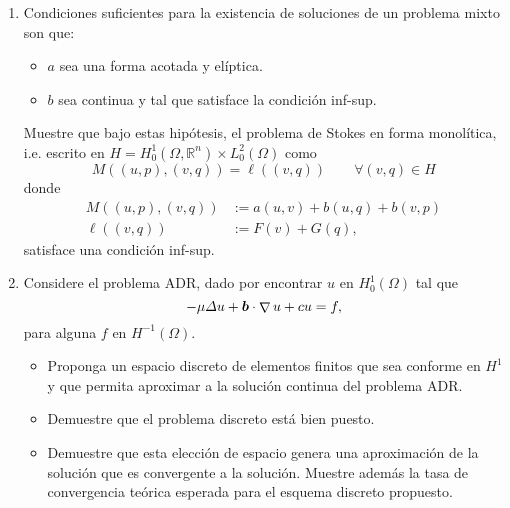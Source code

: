 \documentclass{article}
\renewcommand{\vec}{\vectorsym}
\DeclareMathOperator{\grad}{\nabla}
\newcommand{\R}{\mathbb{R}}
\newcommand{\pts}[1]{[{\bf #1 puntos}] }
\begin{document}
\begin{enumerate}
    \item\pts{2} Condiciones suficientes para la existencia de soluciones de un problema mixto son que:
            \begin{itemize}
                \item $a$ sea una forma acotada y elíptica.
                \item $b$ sea continua y tal que satisface la condición inf-sup.
            \end{itemize}
            Muestre que bajo estas hipótesis, el problema de Stokes en forma monolítica, i.e. escrito en $H = H_0^1(\Omega, \R^n) \times L_0^2(\Omega)$ como
                $$ M((u,p), (v,q)) = \ell((v,q)) \qquad\forall (v,q) \in H $$
                donde 
                $$\begin{aligned}
                    M((u,p), (v,q)) &:= a(u,v) + b(u,q) + b(v,p) \\
                    \ell((v,q))  &:= F(v) + G(q),
                \end{aligned}$$
                satisface una condición inf-sup. 

    \item Considere el problema ADR, dado por encontrar $u$ en $H_0^1(\Omega)$ tal que
            $$ -\mu \Delta u + \vec b \cdot \grad u + cu = f, $$
            para alguna $f$ en $H^{-1}(\Omega)$. 
            \begin{itemize}
                \item\pts{1} Proponga un espacio discreto de elementos finitos que sea conforme en $H^1$ y que permita aproximar a la solución continua del problema ADR.
                \item\pts{1} Demuestre que el problema discreto está bien puesto. 
                \item\pts{2} Demuestre que esta elección de espacio genera una aproximación de la solución que es convergente a la solución. Muestre además la tasa de convergencia teórica esperada para el esquema discreto propuesto. 
            \end{itemize}


\end{enumerate}
\end{document}
